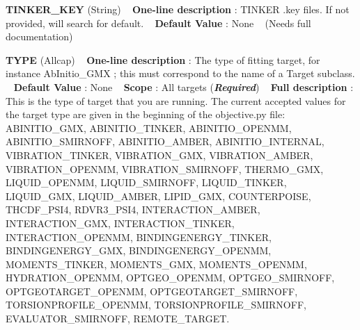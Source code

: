 \begin{DoxyItemize}
\item {\bfseries  T\+I\+N\+K\+E\+R\+\_\+\+K\+EY } (String) ~\newline
{\bfseries  One-\/line description }\+: T\+I\+N\+K\+ER .key files. If not provided, will search for default. ~\newline
{\bfseries  Default Value }\+: None ~\newline
(Needs full documentation)\end{DoxyItemize}
\begin{DoxyItemize}
\item {\bfseries  T\+Y\+PE } (Allcap) ~\newline
{\bfseries  One-\/line description }\+: The type of fitting target, for instance Ab\+Initio\+\_\+\+G\+MX ; this must correspond to the name of a Target subclass. ~\newline
{\bfseries  Default Value }\+: None ~\newline
{\bfseries  Scope }\+: All targets ({\bfseries {\itshape Required}}) ~\newline
{\bfseries  Full description }\+: This is the type of target that you are running. The current accepted values for the target type are given in the beginning of the objective.\+py file\+: A\+B\+I\+N\+I\+T\+I\+O\+\_\+\+G\+MX, A\+B\+I\+N\+I\+T\+I\+O\+\_\+\+T\+I\+N\+K\+ER, A\+B\+I\+N\+I\+T\+I\+O\+\_\+\+O\+P\+E\+N\+MM, A\+B\+I\+N\+I\+T\+I\+O\+\_\+\+S\+M\+I\+R\+N\+O\+FF, A\+B\+I\+N\+I\+T\+I\+O\+\_\+\+A\+M\+B\+ER, A\+B\+I\+N\+I\+T\+I\+O\+\_\+\+I\+N\+T\+E\+R\+N\+AL, V\+I\+B\+R\+A\+T\+I\+O\+N\+\_\+\+T\+I\+N\+K\+ER, V\+I\+B\+R\+A\+T\+I\+O\+N\+\_\+\+G\+MX, V\+I\+B\+R\+A\+T\+I\+O\+N\+\_\+\+A\+M\+B\+ER, V\+I\+B\+R\+A\+T\+I\+O\+N\+\_\+\+O\+P\+E\+N\+MM, V\+I\+B\+R\+A\+T\+I\+O\+N\+\_\+\+S\+M\+I\+R\+N\+O\+FF, T\+H\+E\+R\+M\+O\+\_\+\+G\+MX, L\+I\+Q\+U\+I\+D\+\_\+\+O\+P\+E\+N\+MM, L\+I\+Q\+U\+I\+D\+\_\+\+S\+M\+I\+R\+N\+O\+FF, L\+I\+Q\+U\+I\+D\+\_\+\+T\+I\+N\+K\+ER, L\+I\+Q\+U\+I\+D\+\_\+\+G\+MX, L\+I\+Q\+U\+I\+D\+\_\+\+A\+M\+B\+ER, L\+I\+P\+I\+D\+\_\+\+G\+MX, C\+O\+U\+N\+T\+E\+R\+P\+O\+I\+SE, T\+H\+C\+D\+F\+\_\+\+P\+S\+I4, R\+D\+V\+R3\+\_\+\+P\+S\+I4, I\+N\+T\+E\+R\+A\+C\+T\+I\+O\+N\+\_\+\+A\+M\+B\+ER, I\+N\+T\+E\+R\+A\+C\+T\+I\+O\+N\+\_\+\+G\+MX, I\+N\+T\+E\+R\+A\+C\+T\+I\+O\+N\+\_\+\+T\+I\+N\+K\+ER, I\+N\+T\+E\+R\+A\+C\+T\+I\+O\+N\+\_\+\+O\+P\+E\+N\+MM, B\+I\+N\+D\+I\+N\+G\+E\+N\+E\+R\+G\+Y\+\_\+\+T\+I\+N\+K\+ER, B\+I\+N\+D\+I\+N\+G\+E\+N\+E\+R\+G\+Y\+\_\+\+G\+MX, B\+I\+N\+D\+I\+N\+G\+E\+N\+E\+R\+G\+Y\+\_\+\+O\+P\+E\+N\+MM, M\+O\+M\+E\+N\+T\+S\+\_\+\+T\+I\+N\+K\+ER, M\+O\+M\+E\+N\+T\+S\+\_\+\+G\+MX, M\+O\+M\+E\+N\+T\+S\+\_\+\+O\+P\+E\+N\+MM, H\+Y\+D\+R\+A\+T\+I\+O\+N\+\_\+\+O\+P\+E\+N\+MM, O\+P\+T\+G\+E\+O\+\_\+\+O\+P\+E\+N\+MM, O\+P\+T\+G\+E\+O\+\_\+\+S\+M\+I\+R\+N\+O\+FF, O\+P\+T\+G\+E\+O\+T\+A\+R\+G\+E\+T\+\_\+\+O\+P\+E\+N\+MM, O\+P\+T\+G\+E\+O\+T\+A\+R\+G\+E\+T\+\_\+\+S\+M\+I\+R\+N\+O\+FF, T\+O\+R\+S\+I\+O\+N\+P\+R\+O\+F\+I\+L\+E\+\_\+\+O\+P\+E\+N\+MM, T\+O\+R\+S\+I\+O\+N\+P\+R\+O\+F\+I\+L\+E\+\_\+\+S\+M\+I\+R\+N\+O\+FF, E\+V\+A\+L\+U\+A\+T\+O\+R\+\_\+\+S\+M\+I\+R\+N\+O\+FF, R\+E\+M\+O\+T\+E\+\_\+\+T\+A\+R\+G\+ET. ~\newline

\end{DoxyItemize}
